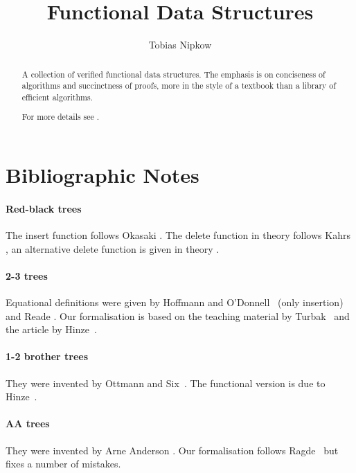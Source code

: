 \documentclass[11pt,a4paper]{article}
\begin{document}
\title{Functional Data Structures}
\author{Tobias Nipkow}
\maketitle

\begin{abstract}
A collection of verified functional data structures. The emphasis is on
conciseness of algorithms and succinctness of proofs, more in the style
of a textbook than a library of efficient algorithms.

For more details see \cite{Nipkow16}.
\end{abstract}

\setcounter{tocdepth}{1}
\tableofcontents
\newpage



\section{Bibliographic Notes}

\paragraph{Red-black trees}
The insert function follows Okasaki \cite{Okasaki}. The delete function
in theory  follows Kahrs \cite{Kahrs-html,Kahrs-JFP01},
an alternative delete function is given in theory .

\paragraph{2-3 trees}
Equational definitions were given by Hoffmann and
O'Donnell~\cite{HoffmannOD-TOPLAS82} (only insertion)
and Reade \cite{Reade-SCP92}.
Our formalisation is based on the teaching material by
Turbak~\cite{Turbak230}  and the article by Hinze~\cite{jfp/Hinze18}.

\paragraph{1-2 brother trees}
They were invented by Ottmann and Six~\cite{OttmannS76,OttmannW-CJ80}.
The functional version is due to Hinze~\cite{Hinze-bro12}.

\paragraph{AA trees}
They were invented by Arne Anderson \cite{Andersson-WADS93}.
Our formalisation follows Ragde~\cite{Ragde14} but fixes a number
of mistakes.
\end{document}
